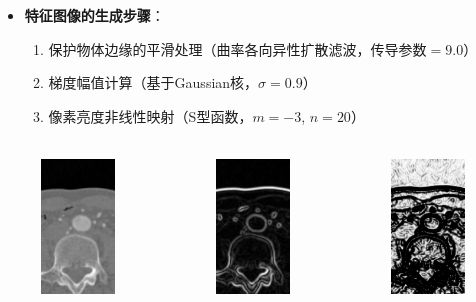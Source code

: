 \begin{frame}
\begin{itemize}
  \item \textbf{特征图像的生成步骤}：
  \begin{enumerate}
     \item 保护物体边缘的平滑处理（曲率各向异性扩散滤波，$\text{传导参数} = 9.0$）
     \item 梯度幅值计算（基于Gaussian核，$\sigma = 0.9$）
     \item 像素亮度非线性映射（S型函数，$m = -3$, $n = 20$）
  \end{enumerate}
\end{itemize}
\begin{columns}[b,onlytextwidth]
\begin{column}{.3\textwidth}
 \begin{figure}[t]
\centering
\includegraphics[height=1.5in]{../../Figures/gac/dcm_smoothing.eps}
\end{figure}
\end{column}
\begin{column}{.3\textwidth}
 \begin{figure}[t]
\centering
\includegraphics[height=1.5in]{../../Figures/gac/dcm_gradient.eps}
\end{figure}
\end{column}
\begin{column}{.3\textwidth}
 \begin{figure}[t]
\centering
\includegraphics[height=1.5in]{../../Figures/gac/dcm_sigmoid.eps}
\end{figure}
\end{column}
\end{columns}
\end{frame}

